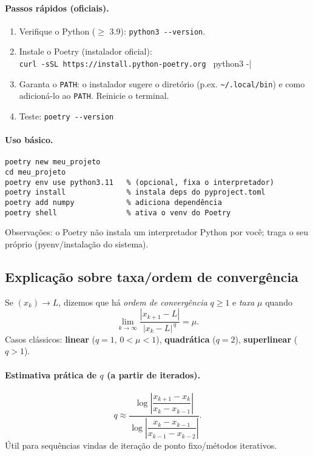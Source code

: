 \documentclass[12pt,a4paper]{article}
\begin{document}
\paragraph{Passos rápidos (oficiais).}
\begin{enumerate}
  \item Verifique o Python (\(\geq\) 3.9): \verb|python3 --version|. \cite{poetry-docs}
  \item Instale o Poetry (instalador oficial):\\
  \verb|curl -sSL https://install.python-poetry.org | python3 -| \cite{poetry-installer}
  \item Garanta o \texttt{PATH}: o instalador sugere o diretório (p.ex. \verb|~/.local/bin|) e como adicioná-lo ao \texttt{PATH}. Reinicie o terminal. \cite{poetry-installer}
  \item Teste: \verb|poetry --version| \cite{poetry-docs}
\end{enumerate}

\paragraph{Uso básico.}
\begin{verbatim}
poetry new meu_projeto
cd meu_projeto
poetry env use python3.11   % (opcional, fixa o interpretador)
poetry install              % instala deps do pyproject.toml
poetry add numpy            % adiciona dependência
poetry shell                % ativa o venv do Poetry
\end{verbatim}
\noindent Observações: o Poetry não instala um interpretador Python por você; traga o seu próprio (pyenv/instalação do sistema). \cite{poetry-basic-usage}

\subsection{Explicação sobre taxa/ordem de convergência}

Se \((x_k)\to L\), dizemos que há \emph{ordem de convergência} \(q\ge 1\) e \emph{taxa} \(\mu\) quando
\[
\lim_{k\to\infty}\frac{|x_{k+1}-L|}{|x_k-L|^{\,q}}=\mu.
\]
Casos clássicos: \textbf{linear} (\(q=1,\,0<\mu<1\)), \textbf{quadrática} (\(q=2\)), \textbf{superlinear} (\(q>1\)). \cite{wikipedia-roc}

\paragraph{Estimativa prática de \(q\) (a partir de iterados).}
\[
q \approx 
\frac{\log\left|\dfrac{x_{k+1}-x_k}{x_k-x_{k-1}}\right|}
     {\log\left|\dfrac{x_k-x_{k-1}}{x_{k-1}-x_{k-2}}\right|}.
\]
Útil para sequências vindas de iteração de ponto fixo/métodos iterativos. \cite{wikipedia-roc,mitran-lecture}
\end{document}
